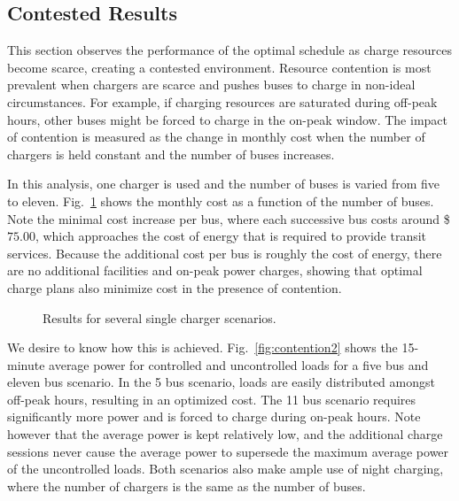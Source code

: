 \subsection{Contested Results}
This section observes the performance of the optimal schedule as charge resources become scarce, creating a contested environment. Resource contention is most prevalent when chargers are scarce and pushes buses to charge in non-ideal circumstances.  For example, if charging resources are saturated during off-peak hours, other buses might be forced to charge in the on-peak window. The impact of contention is measured as the change in monthly cost when the number of chargers is held constant and the number of buses increases. 
\par In this analysis, one charger is used and the number of buses is varied from five to eleven. Fig.~\ref{fig:contention1} shows the monthly cost as a function of the number of buses. Note the minimal cost increase per bus, where each successive bus costs around \$$75.00$, which approaches the cost of energy that is required to provide transit services.  Because the additional cost per bus is roughly the cost of energy, there are no additional facilities and on-peak power charges, showing that optimal charge plans also minimize cost in the presence of contention.
\begin{figure}
	\caption{Results for several single charger scenarios.}
	\label{fig:contention1}
\end{figure}
\par We desire to know how this is achieved. Fig.~\ref{fig:contention2} shows the 15-minute average power for controlled and uncontrolled loads for a five bus and eleven bus scenario. In the 5 bus scenario, loads are easily distributed amongst off-peak hours, resulting in an optimized cost.  The 11 bus scenario requires significantly more power and is forced to charge during on-peak hours.  Note however that the average power is kept relatively low, and the additional charge sessions never cause the average power to supersede the maximum average power of the uncontrolled loads. Both scenarios also make ample use of night charging, where the number of chargers is the same as the number of buses.  
\begin{figure*}
	\centering
	\caption{Comparison of the loads for a 5 and 11 bus scenario with one overhead charger.}
	\label{fig:contention2}
\end{figure*}
